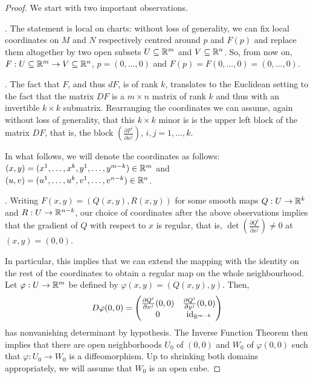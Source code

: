\begin{proof}
  We start with two important observations.

  . The statement is local on charts: without loss of generality,
  we can fix local coordinates on $M$ and $N$ respectively centred around $p$ and $F(p)$
  and replace them altogether by two open subsets $U\subseteq \mathbb{R}^m$ and $V \subseteq \mathbb{R}^n$.
  So, from now on, $F: U \subseteq \mathbb{R}^m \to V \subseteq \mathbb{R}^n$, $p=(0,\ldots,0)$
  and $F(p) = F(0,\ldots,0) = (0,\ldots,0)$.

  . The fact that $F$, and thus $dF$, is of rank $k$, translates to
  the Euclidean setting to the fact that the matrix $DF$ is a $m\times n$ matrix of rank $k$
  and thus with an invertible $k\times k$ submatrix.
  Rearranging the coordinates we can assume, again without loss of generality, that this
  $k\times k$ minor is is the upper left block of the matrix $DF$, that is, the block
  $\left( \frac{\partial F^i}{\partial x^j} \right)$, $i,j = 1,\ldots, k$.

  In what follows, we will denote the coordinates as follows:
  $(x,y) = (x^1, \ldots, x^k, y^1, \ldots, y^{m-k})\in\mathbb{R}^m$
  and $(u,v) = (u^1, \ldots, u^k, v^1, \ldots, v^{n-k})\in\mathbb{R}^n$.
  \medskip

  .
  Writing $F(x,y) = (Q(x,y), R(x,y))$ for some smooth maps $Q: U \to \mathbb{R}^k$ and $R: U \to \mathbb{R}^{n-k}$,
  our choice of coordinates after the above observations implies that the gradient of $Q$ with respect to $x$ is regular, that is,
  $\det \left( \frac{\partial Q^i}{\partial x^j} \right) \neq 0$ at $(x,y) = (0,0)$.

  In particular, this implies that we can extend the mapping with
  the identity on the rest of the coordinates to obtain a regular map
  on the whole neighbourhood.
  Let $\varphi : U \to \mathbb{R}^m$ be defined by $\varphi(x,y) = (Q(x,y), y)$. Then,
  \begin{equation}
    D\varphi(0,0) =
    \begin{pmatrix}
      \frac{\partial Q^i}{\partial x^j}(0,0) & \frac{\partial Q^i}{\partial y^j}(0,0) \\
      0 & \operatorname{id}_{\mathbb{R}^{m-k}}
    \end{pmatrix}
  \end{equation}
  has nonvanishing determinant by hypothesis.
  The Inverse Function Theorem then implies that there are open neighborhoods $U_0$ of $(0,0)$
  and $W_0$ of $\varphi(0,0)$ such that $\varphi : U_0 \to W_0$ is a diffeomorphism.
  Up to shrinking both domains appropriately, we will assume that $W_0$ is an open cube.


\end{proof}
